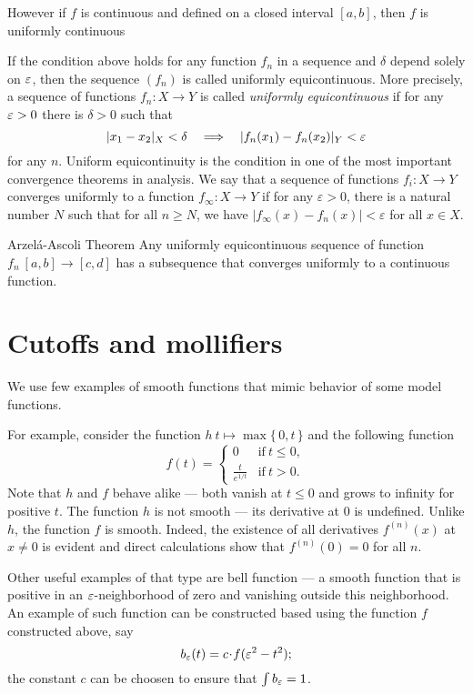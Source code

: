 However if $f$ is continuous and defined on a closed interval $[a,b]$, then $f$ is uniformly continuous

If the condition above holds for any function $f_n$ in a sequence and $\delta$ depend solely on $\varepsilon$,
then the sequence $(f_n)$ is called uniformly equicontinuous.
More precisely, 
a sequence of functions $f_n:X\to Y$ is called \emph{uniformly equicontinuous} if 
for any $\varepsilon>0$ there is $\delta>0$ such that 
\[|x_1-x_2|_X<\delta\quad\Longrightarrow\quad |f_n(x_1)-f_n(x_2)|_Y<\varepsilon\]
for any $n$.
Uniform equicontinuity is the condition in one of the most important convergence theorems in analysis. 
We say that a sequence of functions $f_i : X \to Y$ converges uniformly to a function $f_{\infty}: X \to Y$ if for any 
$\varepsilon >0$, there is a natural number $N$ such that for all $n \geq N$, we have $| f_{\infty} (x)- f_n (x) | < \varepsilon$
for all $x  \in X$.

\begin{thm}{Arzel\'{a}-Ascoli Theorem}\label{lem:equicontinuous}
Any uniformly equicontinuous sequence of function $f_n\:[a,b]\to [c,d]$ has a subsequence that converges uniformly to a continuous function. 
\end{thm}

\section*{Cutoffs and mollifiers}

We use few examples of smooth functions that mimic behavior of some model functions.


For example, consider the function $h\:t\mapsto \max\{\,0,t\,\}$ and the following function
\[f(t)=
\begin{cases}
0&\text{if}\ t\le 0,
\\
\frac{t}{e^{1\!/\!t}}&\text{if}\ t> 0.
\end{cases}
\]
Note that $h$ and $f$ behave alike ---
both vanish at $t\le 0$ and grows to infinity for positive $t$.
The function $h$ is not smooth --- its derivative at $0$ is undefined.
Unlike $h$, the function $f$ is smooth.
Indeed, the existence of all derivatives $f^{(n)}(x)$ at $x\ne 0$ is evident and direct calculations show that $f^{(n)}(0)=0$ for all $n$.

Other useful examples of that type are bell function --- a smooth function that is positive in an $\varepsilon$-neighborhood of zero and vanishing outside this neighborhood.
An example of such function can be constructed based using the function $f$ constructed above, say 
\[b_\eps(t)=c\cdot f(\eps^2-t^2);\]
the constant $c$ can be choosen to ensure that $\int b_\varepsilon=1$.

